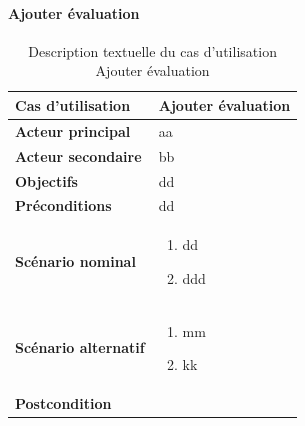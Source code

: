         \paragraph[Ajouter évaluation]{Ajouter évaluation}
        \begin{longtable}{p{4cm} p{9cm}}
            \caption{Description textuelle du cas d’utilisation Ajouter évaluation}
            \label{table:usecaseAjouterEval}
            \\\hline\hline
                \textbf{Cas d’utilisation} & \textbf{Ajouter évaluation}
            \\\hline\hline
                    \textbf{Acteur principal} & aa
                \\
                    \textbf{Acteur secondaire} & bb
                \\
                    \textbf{Objectifs} & dd
                \\
                    \textbf{Préconditions} & dd
                \\
                \textbf{Scénario nominal} &
                    \begin{enumerate}[leftmargin=*]
                        \item dd
                        \item ddd
                    \end{enumerate}
                \\
                \textbf{Scénario alternatif} &
                    \begin{enumerate}[leftmargin=*]
                        \item mm
                        \item kk
                    \end{enumerate}
                \\
                \textbf{Postcondition}
            \\\bottomrule
        \end{longtable}

